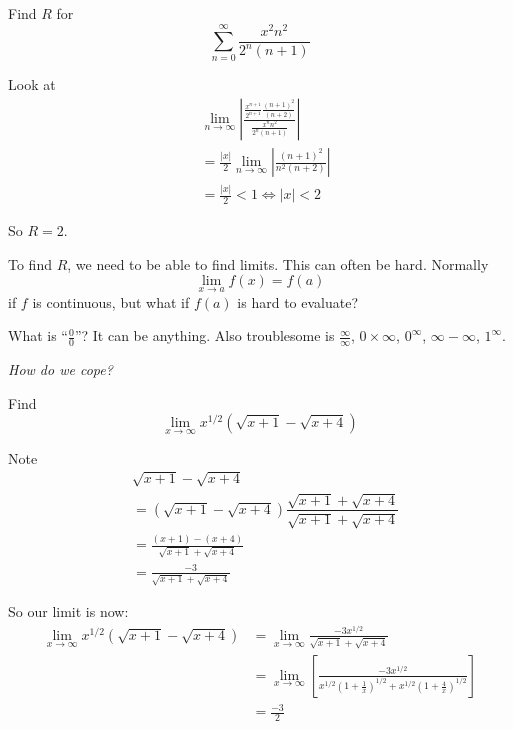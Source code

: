 \documentclass[twoside]{scrartcl}
\begin{document}
\begin{example}Find $R$ for 
\[ \sum_{n=0}^{\infty}\frac{x^2n^2}{2^n(n+1)}\]

Look at 
\[
\begin{aligned}
  &\lim_{n \to \infty} \left|\frac{\frac{x^{n+1}}{2^{n+1}}\frac{(n+1)^2}{(n+2)}}{\frac{x^n n^2}{2^n (n+1)}}\right|\\
  &= \frac{|x|}{2} \lim_{n \to \infty}\left|\frac{(n+1)^2}{n^2(n+2)}\right|\\
  &= \frac{|x|}{2} < 1 \iff |x| < 2
\end{aligned}
\]

So $R = 2$. 
\end{example}\vspace*{5pt}

To find $R$, we need to be able to find limits. This can often be hard. Normally 
\[\lim_{x \to a} f(x) = f(a)\]
if $f$ is continuous, but what if $f(a)$ is hard to evaluate? 

What is ``$\frac{0}{0}$''? It can be anything. Also troublesome is $\frac{\infty}{\infty}$, $0 \times \infty$, $0^{\infty}$, $\infty - \infty$, $1^{\infty}$. 

\emph{How do we cope?}\\

\begin{example} Find
\[\lim_{x \to \infty} x^{1/2}(\sqrt{x+1} - \sqrt{x+4})\]	

Note 
\[
\begin{aligned}
    &\sqrt{x+1} - \sqrt{x+4}\\
    &= (\sqrt{x+1} - \sqrt{x+4})\dfrac{\sqrt{x+1} + \sqrt{x+4}}{\sqrt{x+1} + \sqrt{x+4}}\\
    &= \frac{(x+1) - (x+4)}{\sqrt{x+1} + \sqrt{x+4}}\\
    &= \frac{-3}{\sqrt{x+1}+\sqrt{x+4}}
\end{aligned}
\]

So our limit is now:
\[
\begin{aligned}
  \lim_{x \to \infty} x^{1/2}(\sqrt{x+1} - \sqrt{x+4}) &= \lim_{x \to \infty} \frac{-3x^{1/2}}{\sqrt{x+1}+\sqrt{x+4}}\\
 &= \lim_{x \to \infty} \left[\frac{-3x^{1/2}}{x^{1/2}(1+\frac{1}{x})^{1/2} + x^{1/2}(1 + \frac{4}{x})^{1/2}}\right]\\
 &= \frac{-3}{2} 
\end{aligned}
\]
\end{example}\vspace*{5pt}
\end{document}
